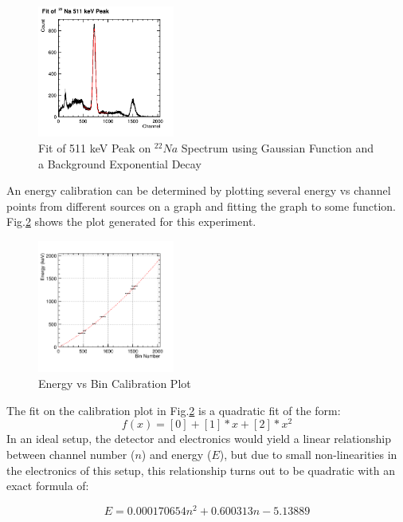 \documentclass[%
 reprint,
 amsmath,amssymb,
 aps,
 pra,
]{revtex4-1}
\begin{document}
\begin{figure}[H]
\centering	
	\centering	
	\includegraphics[width=0.4\textwidth]{Na511keVFit.png}
	\caption{Fit of 511 keV Peak on $^{22}Na$ Spectrum using Gaussian Function and a Background Exponential Decay}
	\label{Fig:Na511Fit}
\end{figure}

An energy calibration can be determined by plotting several energy vs channel points from different sources on a graph and fitting the graph to some function. Fig.\ref{Fig:EvBin} shows the plot generated for this experiment.

\begin{figure}[H]
\centering	
	\includegraphics[width=0.4\textwidth]{BinvEnergy.png}
	\caption{Energy vs Bin Calibration Plot}
	\label{Fig:EvBin}
\end{figure}

The fit on the calibration plot in Fig.\ref{Fig:EvBin} is a quadratic fit of the form:
\begin{equation*}
f(x) = [0] + [1]*x + [2]*x^{2}
\end{equation*}
In an ideal setup, the detector and electronics would yield a linear relationship between channel number ($n$) and energy ($E$), but due to small non-linearities in the electronics of this setup, this relationship turns out to be quadratic with an exact formula of:

\begin{equation*}
E = 0.000170654 n^2 + 0.600313 n - 5.13889
\end{equation*}
\end{document}
